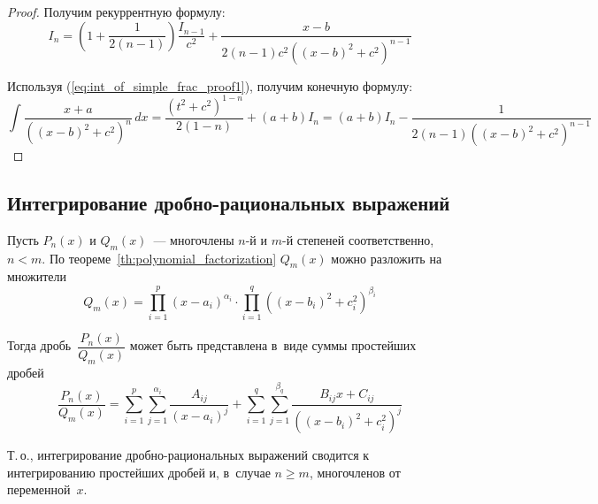 \begin{itemize}
\begin{proof}
	Получим рекуррентную формулу:
	\begin{equation*}
	I_n = \left( 1 + \frac1{2(n - 1)} \right) \frac{I_{n-1}}{c^2} + \frac{x - b}{2(n - 1)c^2 ((x - b)^2 + c^2)^{n-1}}
	\end{equation*}
	
	Используя (\ref*{eq:int_of_simple_frac_proof1}), получим конечную формулу:
	\begin{equation*}
	\int \frac{x + a}{((x - b)^2 + c^2)^n}\,dx =
	\frac{(t^2 + c^2)^{1-n}}{2(1 - n)} + (a + b)I_n =
	(a + b)I_n - \frac1{2(n - 1)((x - b)^2 + c^2)^{n-1}}
	\end{equation*}
	\end{proof}
\end{itemize}

\subsection{Интегрирование дробно-рациональных выражений}
Пусть $P_n(x)$ и $Q_m(x)$~--- многочлены $n$-й и $m$-й степеней соответственно, $n < m$.
По теореме~\ref{th:polynomial_factorization} $Q_m(x)$ можно разложить на множители
\begin{equation*}
Q_m(x) = \prod_{i=1}^{p} (x - a_i)^{\alpha_i} \cdot \prod_{i=1}^{q} ((x - b_i)^2 + c_i^2)^{\beta_i}
\end{equation*}

Тогда дробь~$\dfrac{P_n(x)}{Q_m(x)}$ может быть представлена в~виде суммы простейших дробей
\begin{equation*}
\frac{P_n(x)}{Q_m(x)} = \sum_{i=1}^p \sum_{j=1}^{\alpha_i} \frac{A_{ij}}{(x - a_i)^j} + \sum_{i=1}^q \sum_{j=1}^{\beta_q} \frac{B_{ij}x + C_{ij}}{((x - b_i)^2 + c_i^2)^j}
\end{equation*}

Т.\,о., интегрирование дробно-рациональных выражений сводится к интегрированию простейших дробей и, в~случае $n \geqslant m$, многочленов от переменной~$x$.


